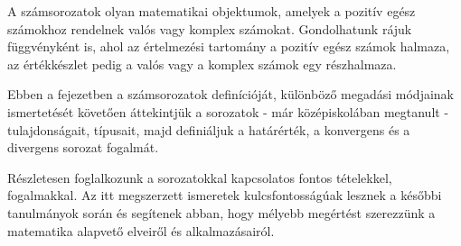 

\bgroup
\color{gray!50!black}
\sffamily

A számsorozatok olyan matematikai objektumok, amelyek a pozitív egész számokhoz
rendelnek valós vagy komplex számokat. Gondolhatunk rájuk függvényként is, ahol
az értelmezési tartomány a pozitív egész számok halmaza, az értékkészlet pedig a
valós vagy a komplex számok egy részhalmaza.

Ebben a fejezetben a számsorozatok definícióját, különböző megadási módjainak
ismertetését követően áttekintjük a sorozatok - már középiskolában megtanult -
tulajdonságait, típusait, majd definiáljuk a határérték, a konvergens és a
divergens sorozat fogalmát.

Részletesen foglalkozunk a sorozatokkal kapcsolatos fontos tételekkel,
fogalmakkal. Az itt megszerzett ismeretek kulcsfontosságúak lesznek a későbbi
tanulmányok során és segítenek abban, hogy mélyebb megértést szerezzünk a
matematika alapvető elveiről és alkalmazásairól.

\chaptertoc
\egroup

\clearpage